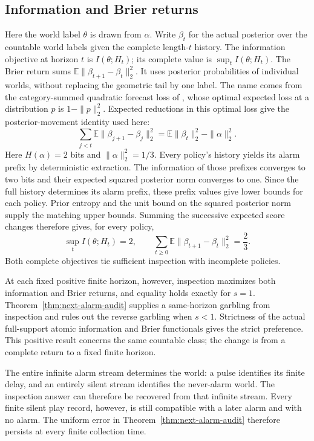 \subsection{Information and Brier returns}
Here the world label $\theta$ is drawn from $\alpha$. Write $\beta_t$ for the
actual posterior over the countable world labels given the complete length-$t$
history. The information objective at horizon $t$
is $I(\theta;H_t)$; its complete value is $\sup_t I(\theta;H_t)$.
The Brier return sums
$\mathbb E\|\beta_{t+1}-\beta_t\|_2^2$. It uses posterior probabilities
of individual worlds, without replacing the geometric tail by one label.
The name comes from the category-summed quadratic forecast loss of
\citet[Equations (2)--(4)]{brier1950verification}, whose optimal expected loss
at a distribution $p$ is $1-\|p\|_2^2$. Expected reductions in this optimal loss
give the posterior-movement identity used here:
\[
 \sum_{j<t}\mathbb E\|\beta_{j+1}-\beta_j\|_2^2
 =\mathbb E\|\beta_t\|_2^2-\|\alpha\|_2^2.
\]
Here $H(\alpha)=2$ bits and $\|\alpha\|_2^2=1/3$.
Every policy's history yields its alarm prefix by deterministic extraction.
The information of those prefixes converges to two bits and their expected
squared posterior norm converges to one. Since the full history determines its
alarm prefix, these prefix values give lower bounds for each policy. Prior
entropy and the unit bound on the squared posterior norm supply the matching
upper bounds. Summing the successive expected score changes therefore
gives, for every policy,
\begin{equation}\label{eq:next-complete-posterior}
 \sup_t I(\theta;H_t)=2,\qquad
 \sum_{t\ge0}\mathbb E\|\beta_{t+1}-\beta_t\|_2^2=\frac23.
\end{equation}
Both complete objectives tie sufficient inspection with incomplete policies.

At each fixed positive finite horizon, however, inspection maximizes both
information and Brier returns, and equality holds exactly for
$s=1$. Theorem~\ref{thm:next-alarm-audit} supplies a same-horizon garbling
from inspection and rules out the reverse garbling when $s<1$. Strictness
of the actual full-support atomic information and Brier functionals gives
the strict preference. This positive result concerns the same countable
class; the change is from a complete return to a fixed finite horizon.

The entire infinite alarm stream determines the world: a pulse identifies its
finite delay, and an entirely silent stream identifies the never-alarm world.
The inspection answer can therefore be recovered from that infinite stream.
Every finite silent play record, however, is still compatible with a later alarm
and with no alarm. The uniform error in Theorem~\ref{thm:next-alarm-audit}
therefore persists at every finite collection time.

